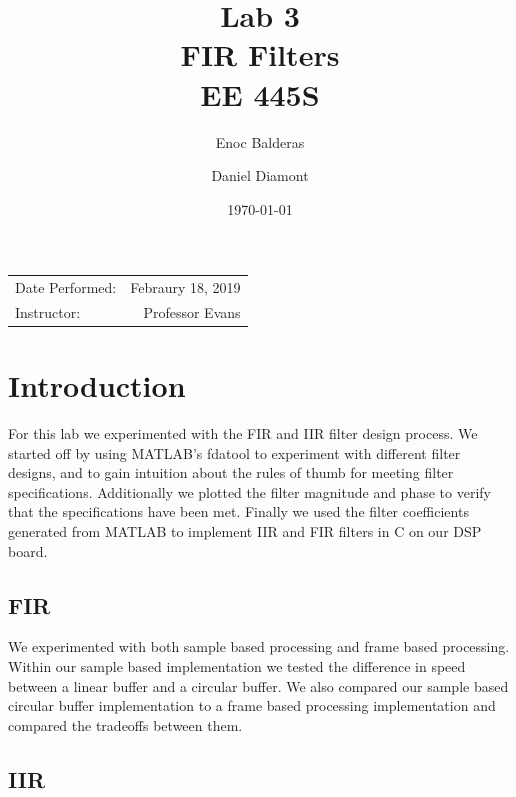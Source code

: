\documentclass{article}
\title{Lab 3\\ FIR Filters\\ EE 445S} %
\author{Enoc Balderas\\
        \and
        Daniel Diamont\\} %
\date{\today} %
\begin{document}
\maketitle %

\begin{center}
\begin{tabular}{l r}
Date Performed: & Febraury 18, 2019 \\ %
Instructor: & Professor Evans %
\end{tabular}
\end{center}



\section{Introduction}

For this  lab we experimented with the FIR and IIR filter design process.
We started off by using MATLAB's fdatool to experiment with different filter designs, and to gain intuition about the rules of thumb for meeting filter specifications.
Additionally we plotted the filter magnitude and phase to verify that the specifications have been met.
Finally we used the filter coefficients generated from MATLAB to implement IIR and FIR filters in C on our DSP board.

\subsection{FIR}

We experimented with both sample based processing and frame based processing.
Within our sample based implementation we tested the difference in speed between a linear buffer and a circular buffer.
We also compared our sample based circular buffer implementation to a frame based processing implementation and compared the tradeoffs between them.

\subsection{IIR}
\end{document}
